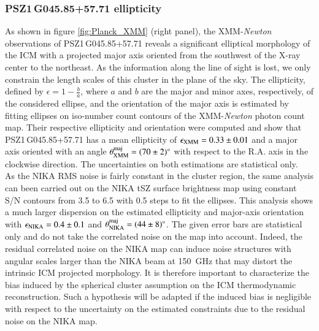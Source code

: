 \documentclass[traditabstract]{aa}
\begin{document}
\subsubsection{\mbox{PSZ1\,G045.85+57.71} ellipticity}\label{sec:PSZ1G045_ellipticity}
As shown in figure \ref{fig:Planck_XMM} (right panel), the XMM-{\it Newton} observations of \mbox{PSZ1\,G045.85+57.71} reveals a significant elliptical morphology of the ICM with a projected major axis oriented from the southwest of the X-ray center to the northeast. As the information along the line of sight is lost, we only constrain the length scales of this cluster in the plane of the sky. The ellipticity, defined by $\epsilon = 1 - \frac{b}{a}$, where $a$ and $b$ are the major and minor axes, respectively,  of the considered ellipse, and the orientation of the major axis is estimated by fitting ellipses on iso-number count contours of the XMM-{\it Newton} photon count map. Their respective ellipticity and orientation were computed and show that \mbox{PSZ1\,G045.85+57.71} has a mean ellipticity of $\epsilon_{\rm{XMM}} = 0.33 \pm 0.01$ and a major axis oriented with an angle $\theta_{\rm{XMM}}^{\rm{maj}} = (70 \pm 2)^{\circ}$ with respect to the R.A. axis in the clockwise direction. The uncertainties on both estimations are statistical only.\\
\indent As the NIKA RMS noise is fairly constant in the cluster region, the same analysis can been carried out on the NIKA tSZ surface brightness map using constant S/N contours from 3.5 to 6.5 with 0.5 steps to fit the ellipses. This analysis shows a much larger dispersion on the estimated ellipticity and major-axis orientation with $\epsilon_{\rm{NIKA}} = 0.4 \pm 0.1$ and $\theta_{\rm{NIKA}}^{\rm{maj}} = (44 \pm 8)^{\circ}$. The given error bars are statistical only and do not take the correlated noise on the map into account. Indeed, the residual correlated noise on the NIKA map can induce noise structures with angular scales larger than the NIKA beam at 150~GHz that may distort the intrinsic ICM projected morphology. It is therefore important to characterize the bias induced by the spherical cluster assumption on the ICM thermodynamic reconstruction. Such a hypothesis will be adapted if the induced bias is negligible with respect to the uncertainty on the estimated constraints due to the residual noise on the NIKA map.
\end{document}
